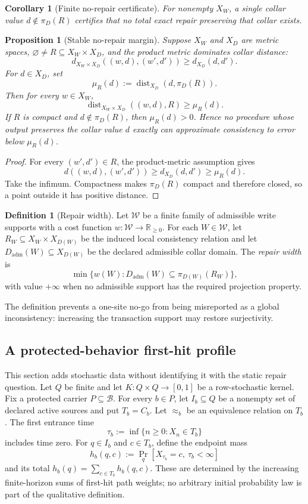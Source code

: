 \documentclass[11pt]{article}
\newtheorem{proposition}[theorem]{Proposition}
\newtheorem{corollary}[theorem]{Corollary}
\theoremstyle{definition}
\newtheorem{definition}[theorem]{Definition}
\theoremstyle{remark}
\numberwithin{equation}{section}
\newcommand{\dist}{\operatorname{dist}}
\newcommand{\cB}{\mathcal B}
\begin{document}
\begin{corollary}[Finite no-repair certificate]
For nonempty $X_W$, a single collar value
$d\notin\pi_D(R)$ certifies that no total exact repair preserving that collar
exists.
\end{corollary}

\begin{proposition}[Stable no-repair margin]\label{prop:stable-no-repair}
Suppose $X_W$ and $X_D$ are metric spaces, $\varnothing\ne R\subseteq X_W\times X_D$, and the product metric dominates collar distance:
\[
 d_{X_W\times X_D}((w,d),(w',d'))\ge d_{X_D}(d,d').
\]
For $d\in X_D$, set
\[
 \mu_R(d):=\dist_{X_D}(d,\pi_D(R)).
\]
Then for every $w\in X_W$,
\[
 \dist_{X_W\times X_D}((w,d),R)\ge\mu_R(d).
\]
If $R$ is compact and $d\notin\pi_D(R)$, then $\mu_R(d)>0$.  Hence no procedure whose output preserves the collar value $d$ exactly can approximate consistency to error below $\mu_R(d)$.
\end{proposition}

\begin{proof}
For every $(w',d')\in R$, the product-metric assumption gives
\[
 d((w,d),(w',d'))
 \ge d_{X_D}(d,d')
 \ge \mu_R(d).
\]
Take the infimum.  Compactness makes $\pi_D(R)$ compact and therefore
closed, so a point outside it has positive distance.
\end{proof}

\begin{definition}[Repair width]
Let $\mathscr W$ be a finite family of admissible write supports with a cost function $w:\mathscr W\to\mathbb R_{\ge0}$.  For each $W\in\mathscr W$, let $R_W\subseteq X_W\times X_{D(W)}$ be the induced local consistency relation and let $D_{\mathrm{adm}}(W)\subseteq X_{D(W)}$ be the declared admissible collar domain.  The \emph{repair width} is
\[
 \min\{w(W):D_{\mathrm{adm}}(W)\subseteq\pi_{D(W)}(R_W)\},
\]
with value $+\infty$ when no admissible support has the required projection property.
\end{definition}

The definition prevents a one-site no-go from being misreported as a global inconsistency: increasing the transaction support may restore surjectivity.

\subsection{A protected-behavior first-hit profile}
\label{sec:protected-first-hit}

This section adds stochastic data without identifying it with the static
repair question.  Let $Q$ be finite and let $K:Q\times Q\to[0,1]$ be a row-stochastic
kernel.  Fix a protected carrier $P\subseteq\cB$.  For every $b\in P$, let
$I_b\subseteq Q$ be a nonempty set of declared active sources and put
$T_b=C_b$.  Let $\approx_b$ be an equivalence relation on $T_b$.  The first
entrance time
\[
 \tau_b:=\inf\{n\geq0:X_n\in T_b\}
\]
includes time zero.  For $q\in I_b$ and $c\in T_b$, define the endpoint mass
\[
 h_b(q,c):=\Pr_q[X_{\tau_b}=c,\ \tau_b<\infty]
\]
and its total $h_b(q)=\sum_{c\in T_b}h_b(q,c)$.  These are determined by the
increasing finite-horizon sums of first-hit path weights; no arbitrary initial
probability law is part of the qualitative definition.
\end{document}
